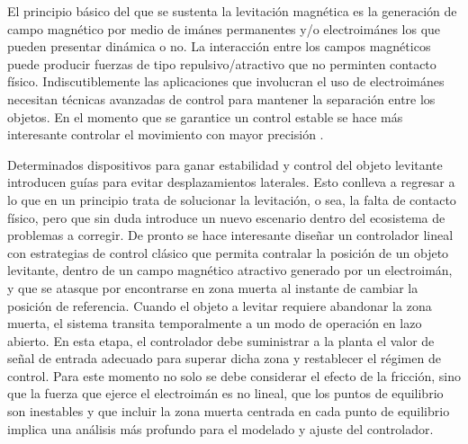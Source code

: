 El principio básico del que se sustenta la levitación magnética es la generación de campo magnético por medio de imánes permanentes y/o electroimánes los que
pueden presentar dinámica o no. La interacción entre los campos magnéticos puede producir fuerzas de tipo repulsivo/atractivo que no perminten contacto físico. Indiscutiblemente 
las aplicaciones que involucran el uso de electroimánes necesitan técnicas avanzadas de control para mantener la separación entre los objetos. En el momento que se garantice un control 
estable se hace más interesante controlar el movimiento con mayor precisión \cite{hyung}. 

Determinados dispositivos para ganar estabilidad y control del objeto levitante introducen guías para evitar desplazamientos laterales. 
Esto conlleva a regresar a lo que en un principio trata de solucionar la levitación, o sea, la falta de contacto físico, pero que sin duda introduce un nuevo escenario dentro del ecosistema de problemas a corregir.
De pronto se hace interesante diseñar un controlador lineal con estrategias de control clásico que permita contralar la posición de un objeto levitante, dentro de un campo magnético atractivo generado por un electroimán, y que 
se atasque por encontrarse en zona muerta al instante de cambiar la posición de referencia. Cuando el objeto a levitar requiere abandonar la zona muerta, el sistema transita temporalmente a un modo de operación en lazo abierto. 
En esta etapa, el controlador debe suministrar a la planta el valor de señal de entrada adecuado para superar dicha zona y restablecer el régimen de control. Para este momento no solo se debe considerar el efecto de la fricción, sino 
que la fuerza que ejerce el electroimán es no lineal, que los puntos de equilibrio son inestables y que incluir la zona muerta centrada en cada punto de equilibrio implica una análisis más profundo para el modelado y ajuste del controlador.


